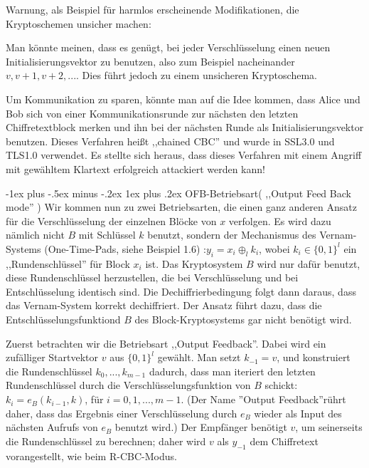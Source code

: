\documentclass[a4paper]{article}
\makeatletter
\renewcommand{\subsubsection}{\@startsection{subsubsection}{3}{0mm}%
 {-1ex plus -.5ex minus -.2ex}%
 {1ex plus .2ex}%
 {\normalfont\small\bfseries}}
\makeatother
\begin{document}
\begin{multicols}{3}
    Warnung, als Beispiel für harmlos erscheinende Modifikationen, die Kryptoschemen unsicher machen:
    \begin{enumerate*}
        \item Man könnte meinen, dass es genügt, bei jeder Verschlüsselung einen neuen Initialisierungsvektor zu benutzen, also zum Beispiel nacheinander $v,v+1,v+2,...$. Dies führt jedoch zu einem unsicheren Kryptoschema.
        \item  Um Kommunikation zu sparen, könnte man auf die Idee kommen, dass Alice und Bob sich von einer Kommunikationsrunde zur nächsten den letzten Chiffretextblock merken und ihn bei der nächsten Runde als Initialisierungsvektor benutzen. Dieses Verfahren heißt ,,chained CBC'' und wurde in SSL3.0 und TLS1.0 verwendet. Es stellte sich heraus, dass dieses Verfahren mit einem Angriff mit gewähltem Klartext erfolgreich attackiert werden kann!
    \end{enumerate*}

    \subsubsection{OFB-Betriebsart( ,,Output Feed Back mode'' )}
    Wir kommen nun zu zwei Betriebsarten, die einen ganz anderen Ansatz für die Verschlüsselung der einzelnen Blöcke von $x$ verfolgen. Es wird dazu nämlich nicht $B$ mit Schlüssel $k$ benutzt, sondern der Mechanismus des Vernam-Systems (One-Time-Pads, siehe Beispiel 1.6) :$y_i=x_i\oplus_l k_i$, wobei $k_i\in\{0,1\}^l$ ein ,,Rundenschlüssel'' für Block $x_i$ ist. Das Kryptosystem $B$ wird nur dafür benutzt, diese Rundenschlüssel herzustellen, die bei Verschlüsselung und bei Entschlüsselung identisch sind. Die Dechiffrierbedingung folgt dann daraus, dass das Vernam-System korrekt dechiffriert. Der Ansatz führt dazu, dass die Entschlüsselungsfunktiond $B$ des Block-Kryptosystems gar nicht benötigt wird.

    Zuerst betrachten wir die Betriebsart ,,Output Feedback''. Dabei wird ein zufälliger Startvektor $v$ aus $\{0,1\}^l$ gewählt. Man setzt $k_{-1}=v$, und konstruiert die Rundenschlüssel $k_0,...,k_{m-1}$ dadurch, dass man iteriert den letzten Rundenschlüssel durch die Verschlüsselungsfunktion von $B$ schickt: $k_i=e_B(k_{i-1}, k)$, für $i=0,1,...,m-1$. (Der Name ''Output Feedback''rührt daher, dass das Ergebnis einer Verschlüsselung durch $e_B$ wieder als Input des nächsten Aufrufs von $e_B$ benutzt wird.) Der Empfänger benötigt $v$, um seinerseits die Rundenschlüssel zu berechnen; daher wird $v$ als $y_{-1}$ dem Chiffretext vorangestellt, wie beim R-CBC-Modus.


\end{multicols}
\end{document}

